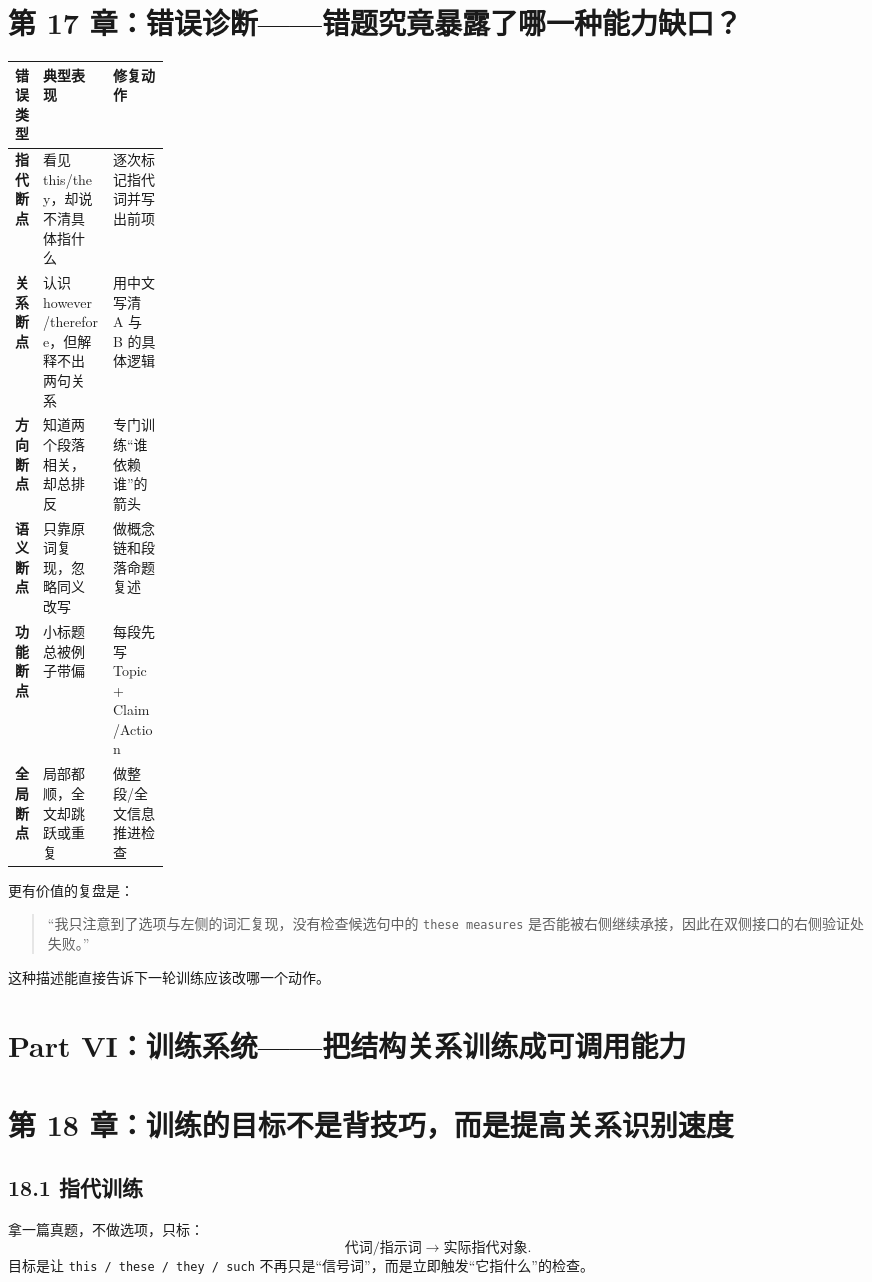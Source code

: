 \documentclass[11pt,a4paper]{ctexart}
\begin{document}
\section{第 17 章：错误诊断——错题究竟暴露了哪一种能力缺口？}

\begin{center}
\small
\begin{tabularx}{\linewidth}{>{\bfseries}p{0.18\linewidth} X X}
\toprule
错误类型 & 典型表现 & 修复动作 \\
\midrule
指代断点 & 看见 this/they，却说不清具体指什么 & 逐次标记指代词并写出前项 \\
关系断点 & 认识 however/therefore，但解释不出两句关系 & 用中文写清 A 与 B 的具体逻辑 \\
方向断点 & 知道两个段落相关，却总排反 & 专门训练“谁依赖谁”的箭头 \\
语义断点 & 只靠原词复现，忽略同义改写 & 做概念链和段落命题复述 \\
功能断点 & 小标题总被例子带偏 & 每段先写 Topic + Claim/Action \\
全局断点 & 局部都顺，全文却跳跃或重复 & 做整段/全文信息推进检查 \\
\bottomrule
\end{tabularx}
\end{center}

\begin{method}
更有价值的复盘是：
\begin{quote}
“我只注意到了选项与左侧的词汇复现，没有检查候选句中的 \texttt{these measures} 是否能被右侧继续承接，因此在双侧接口的右侧验证处失败。”
\end{quote}
这种描述能直接告诉下一轮训练应该改哪一个动作。
\end{method}

\section{Part VI：训练系统——把结构关系训练成可调用能力}

\section{第 18 章：训练的目标不是背技巧，而是提高关系识别速度}

\subsection{18.1 指代训练}
拿一篇真题，不做选项，只标：
\[
\text{代词/指示词}
\rightarrow
\text{实际指代对象}.
\]
目标是让 \texttt{this / these / they / such} 不再只是“信号词”，而是立即触发“它指什么”的检查。
\end{document}
